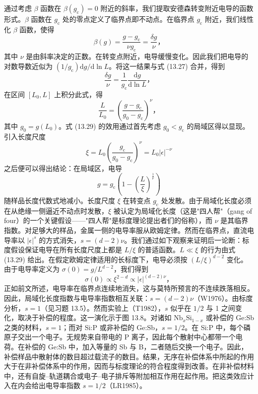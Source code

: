 通过考虑 $\beta$ 函数在 $\beta(g_{\mathrm{c}})=0$ 附近的斜率，我们提取安德森转变附近电导的函数形式。$\beta$ 函数在 $g_{\mathrm{c}}$ 处的零点定义了临界点即不动点。在临界点 $g_{\mathrm{c}}$ 附近，我们线性化 $\beta$ 函数，使得
\begin{equation*}
\beta(g)=\frac{g-g_{\mathrm{c}}}{\nu g_{\mathrm{c}}}=\frac{\delta g}{\nu}\text{，}\tag{13.27}
\end{equation*}
其中 $\nu$ 是由斜率决定的正数。在转变点附近，电导缓慢变化。因此我们把电导的对数导数近似为 $(1/g_{\mathrm{c}})\mathrm{d}g/\mathrm{d}\ln L$。将这一结果与式 (13.27) 合并，得到
\begin{equation*}
\frac{\delta g}{\nu}=\frac{1}{g_{\mathrm{c}}}\frac{\mathrm{d}g}{\mathrm{d}\ln L}\text{，}\tag{13.28}
\end{equation*}
在区间 $[L_{0},L]$ 上积分此式，得
\begin{equation*}
\frac{L}{L_{0}}=\left(\frac{g-g_{\mathrm{c}}}{g_{0}-g_{\mathrm{c}}}\right)^{\nu}\text{，}\tag{13.29}
\end{equation*}
其中 $g_{0}=g(L_{0})$。式 (13.29) 的效用通过首先考虑 $g_{0}<g_{\mathrm{c}}$ 的局域区得以显现。引入长度尺度
\begin{equation*}
\xi=L_{0}\left(\frac{g_{\mathrm{c}}}{g_{0}-g_{\mathrm{c}}}\right)^{\nu}=L_{0}|\epsilon|^{-\nu}\tag{13.30}
\end{equation*}
之后便可以得出结论：在局域区，电导
\begin{equation*}
g=g_{\mathrm{c}}\left(1-\left(\frac{L}{\xi}\right)^{\frac{1}{\nu}}\right)\tag{13.31}
\end{equation*}
随样品长度代数式地减小。长度尺度 $\xi$ 在转变点 $g_{\mathrm{c}}$ 处发散。由于局域化长度必须在从绝缘一侧逼近不动点时发散，$\xi$ 被认定为局域化长度（这是"四人帮"（gang of four）的一个关键假设——"四人帮"是标度理论提出者们的俗称），而 $\nu$ 是其临界指数。对足够大的样品，金属一侧的电导率服从欧姆定律。然而在临界点，直流电导率以 $|\epsilon|^{s}$ 的方式消失，$s=(d-2)\nu$。我们通过如下观察来证明后一论断：标度假设保证电导在所有长度尺度上都是 $L/\xi$ 的普适函数。$L\ll\xi$ 的行为由式 (13.29) 给出。在假定欧姆定律适用的长标度下，电导必须按 $(L/\xi)^{d-2}$ 变化。由于电导率定义为 $\sigma(0)=g/L^{d-2}$，我们得到
\begin{equation*}
\sigma(0)\propto\xi^{2-d}\propto|\epsilon|^{(d-2)\nu}\text{，}\tag{13.32}
\end{equation*}
正如前文所述，电导率在临界点连续地消失，这与莫特所预言的不连续跌落相反。因此，局域化长度指数与电导率指数相互关联：$s=(d-2)\nu$（W1976）。由标度分析，$s=1$（见习题 13.5）。然而实验上（T1982），$s$ 似乎在 $1/2$ 与 1 之间变化，取决于补偿的程度。这一演化示于图 13.8。对诸如 $\mathrm{Nb}_{x}\mathrm{Si}_{1-x}$ 或补偿的 Ge:Sb 之类的材料，$s=1$；而对 Si:P 或非补偿的 Ge:Sb，$s=1/2$。在 Si:P 中，每个磷原子交出一个电子。无规势来自带电的 P 离子，因此每个散射中心都带一个电荷。在补偿的 Ge:Sb 中，加入等量的 Sb 与 B，二者随后交换一个电子。因此，补偿样品中散射体的数目超过载流子的数目。结果，无序在补偿体系中所起的作用大于在非补偿体系中的作用，因而与标度理论的符合程度得到改善。在非补偿材料中，还有自旋--轨道耦合或电子--电子排斥等附加相互作用在起作用。把这类效应计入在内会给出电导率指数 $s=1/2$（LR1985）。

